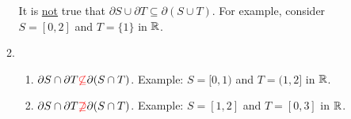\begin{enumerate}
\begin{enumerate}
\begin{warning}
It is \underline{not} true that \(\partial S\cup\partial T\subseteq
\partial(S\cup T)\). For example, consider \(S=[0,2]\) and \(T=\{1\}\) in
\(\mathbb{R}\).
\end{warning}
\item \begin{enumerate}
\item \(\partial S\cap\partial T{\color{red}\not\subseteq } \partial(S\cap T)\). Example:
\(S=[0,1)\) and \(T=(1,2]\) in \(\mathbb{R}\).
\item \(\partial S\cap\partial T{\color{red}\not\supseteq}\partial(S\cap T)\). Example:
\(S=[1,2]\) and \(T=[0,3]\) in \(\mathbb{R}\).

\end{enumerate}
%
%
%
%

\end{enumerate}
\end{enumerate}
